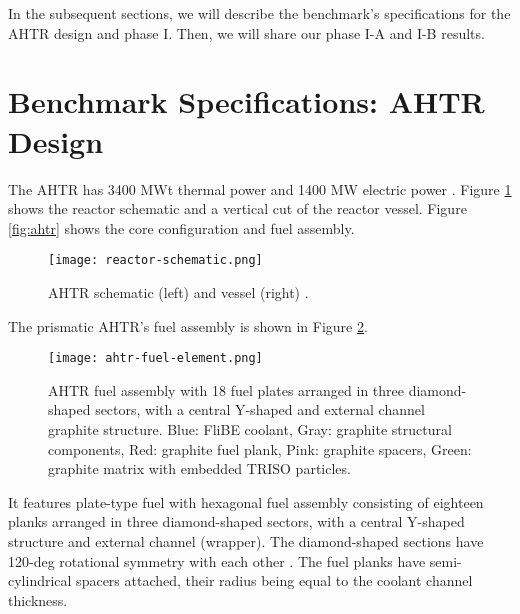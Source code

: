 In the subsequent sections, we will describe the benchmark's specifications for 
the \gls{AHTR} design and phase I. Then, we will share our phase I-A and I-B 
results. 

\section{Benchmark Specifications: AHTR Design}
The \gls{AHTR} has 3400 MWt thermal power and 1400 MW electric power 
\cite{varma_ahtr_2012}. 
Figure \ref{fig:reactor-schematic} shows the reactor schematic and a vertical 
cut of the reactor vessel. 
Figure \ref{fig:ahtr} shows the core configuration and fuel assembly. 
\begin{figure}[]
    \centering
    \texttt{[image: reactor-schematic.png]} 
    \caption{\acrlong{AHTR} schematic (left) and vessel (right) 
    \cite{noauthor_fluoride_nodate}.}
    \label{fig:reactor-schematic}
\end{figure}
The prismatic \gls{AHTR}'s fuel assembly is shown in Figure 
\ref{fig:ahtr-fuel-assembly}.  
\begin{figure}[]
    \centering
    \texttt{[image: ahtr-fuel-element.png]} 
    \caption{\acrlong{AHTR} fuel assembly with 18 fuel plates arranged in 
    three diamond-shaped sectors, with a central Y-shaped and external channel 
    graphite structure. Blue: FliBE coolant, Gray: graphite structural components, 
    Red: graphite fuel plank, Pink: graphite spacers, Green: graphite matrix 
    with embedded TRISO particles.}
    \label{fig:ahtr-fuel-assembly}
\end{figure}
It features plate-type fuel with hexagonal fuel assembly consisting of eighteen 
planks arranged in three diamond-shaped sectors, with a central Y-shaped 
structure and external channel (wrapper).
The diamond-shaped sections have 120-deg rotational symmetry with each other 
\cite{varma_ahtr_2012,ramey_monte_2018,noauthor_fluoride_nodate}. 
The fuel planks have semi-cylindrical spacers attached, their radius being 
equal to the coolant channel thickness. 

